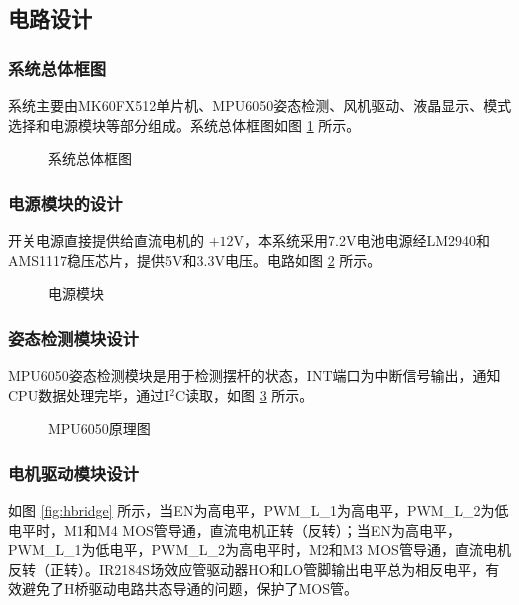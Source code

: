 \documentclass[zihao=-4,fontset=none]{ctexart}
\begin{document}
\subsection{电路设计}

\subsubsection{系统总体框图}

系统主要由MK60FX512单片机、MPU6050姿态检测、风机驱动、液晶显示、模式选择和电源模块等部分组成。系统总体框图如图 \ref{fig:sys_block} 所示。

\begin{figure}[H]
    \centering
    \caption{系统总体框图}
    \label{fig:sys_block}
\end{figure}

\subsubsection{电源模块的设计}

开关电源直接提供给直流电机的 $+12\mathrm{V}$，本系统采用7.2V电池电源经LM2940和AMS1117稳压芯片，提供5V和3.3V电压。电路如图 \ref{fig:power} 所示。

\begin{figure}[H]
    \centering
    \caption{电源模块}
    \label{fig:power}
\end{figure}

\subsubsection{姿态检测模块设计}

MPU6050姿态检测模块是用于检测摆杆的状态，INT端口为中断信号输出，通知CPU数据处理完毕，通过I$^2$C读取，如图 \ref{fig:mpu} 所示。

\begin{figure}[H]
    \centering
    \caption{MPU6050原理图}
    \label{fig:mpu}
\end{figure}

\subsubsection{电机驱动模块设计}

如图 \ref{fig:hbridge} 所示，当EN为高电平，PWM\_L\_1为高电平，PWM\_L\_2为低电平时，M1和M4 MOS管导通，直流电机正转（反转）；当EN为高电平，PWM\_L\_1为低电平，PWM\_L\_2为高电平时，M2和M3 MOS管导通，直流电机反转（正转）。IR2184S场效应管驱动器HO和LO管脚输出电平总为相反电平，有效避免了H桥驱动电路共态导通的问题，保护了MOS管。
\end{document}
